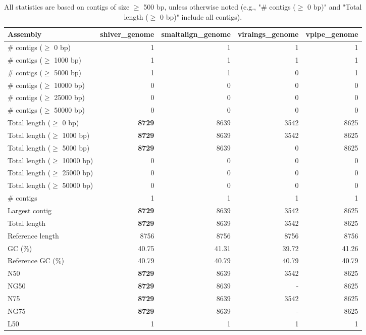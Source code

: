 \documentclass[12pt,a4paper]{article}
\begin{document}
\begin{table}[ht]
\begin{center}
\caption{All statistics are based on contigs of size $\geq$ 500 bp, unless otherwise noted (e.g., "\# contigs ($\geq$ 0 bp)" and "Total length ($\geq$ 0 bp)" include all contigs).}
\begin{tabular}{|l*{4}{|r}|}
\hline
Assembly & shiver\_genome & smaltalign\_genome & viralngs\_genome & vpipe\_genome \\ \hline
\# contigs ($\geq$ 0 bp) & 1 & 1 & 1 & 1 \\ \hline
\# contigs ($\geq$ 1000 bp) & 1 & 1 & 1 & 1 \\ \hline
\# contigs ($\geq$ 5000 bp) & 1 & 1 & 0 & 1 \\ \hline
\# contigs ($\geq$ 10000 bp) & 0 & 0 & 0 & 0 \\ \hline
\# contigs ($\geq$ 25000 bp) & 0 & 0 & 0 & 0 \\ \hline
\# contigs ($\geq$ 50000 bp) & 0 & 0 & 0 & 0 \\ \hline
Total length ($\geq$ 0 bp) & {\bf 8729} & 8639 & 3542 & 8625 \\ \hline
Total length ($\geq$ 1000 bp) & {\bf 8729} & 8639 & 3542 & 8625 \\ \hline
Total length ($\geq$ 5000 bp) & {\bf 8729} & 8639 & 0 & 8625 \\ \hline
Total length ($\geq$ 10000 bp) & 0 & 0 & 0 & 0 \\ \hline
Total length ($\geq$ 25000 bp) & 0 & 0 & 0 & 0 \\ \hline
Total length ($\geq$ 50000 bp) & 0 & 0 & 0 & 0 \\ \hline
\# contigs & 1 & 1 & 1 & 1 \\ \hline
Largest contig & {\bf 8729} & 8639 & 3542 & 8625 \\ \hline
Total length & {\bf 8729} & 8639 & 3542 & 8625 \\ \hline
Reference length & 8756 & 8756 & 8756 & 8756 \\ \hline
GC (\%) & 40.75 & 41.31 & 39.72 & 41.26 \\ \hline
Reference GC (\%) & 40.79 & 40.79 & 40.79 & 40.79 \\ \hline
N50 & {\bf 8729} & 8639 & 3542 & 8625 \\ \hline
NG50 & {\bf 8729} & 8639 & - & 8625 \\ \hline
N75 & {\bf 8729} & 8639 & 3542 & 8625 \\ \hline
NG75 & {\bf 8729} & 8639 & - & 8625 \\ \hline
L50 & 1 & 1 & 1 & 1 \\ \hline

\end{tabular}
\end{center}
\end{table}
\end{document}
